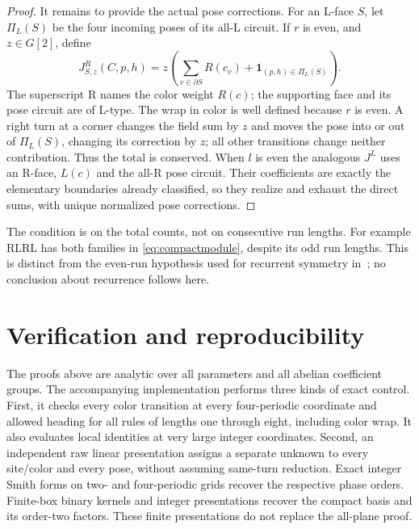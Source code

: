 \documentclass[11pt]{article}
\theoremstyle{definition}
\newcommand{\ind}{\mathbf 1}
\begin{document}
\begin{proof}
It remains to provide the actual pose corrections. For an L-face $S$, let
$\Pi_L(S)$ be the four incoming poses of its all-L circuit. If $r$ is even,
and $z\in G[2]$, define
\begin{equation}\label{eq:compactgenerator}
 J^R_{S,z}(C,p,h)
 =z\left(\sum_{v\in\partial S}R(c_v)+\ind_{(p,h)\in\Pi_L(S)}\right).
\end{equation}
The superscript R names the color weight $R(c)$; the supporting face and
its pose circuit are of L-type. The wrap in color is well defined because $r$ is even. A right turn at a
corner changes the field sum by $z$ and moves the pose into or out of
$\Pi_L(S)$, changing its correction by $z$; all other transitions change
neither contribution. Thus the total is conserved. When $l$ is even the
analogous $J^L$ uses an R-face, $L(c)$ and the all-R pose circuit. Their
coefficients are exactly the elementary boundaries already classified, so
they realize and exhaust the direct sums, with unique normalized pose corrections.
\end{proof}

The condition is on the total counts, not on consecutive run lengths. For
example RLRL has both families in \eqref{eq:compactmodule}, despite its odd run
lengths. This is distinct from the even-run hypothesis used for recurrent
symmetry in~\cite{gale}; no conclusion about recurrence follows here.

\section{Verification and reproducibility}
The proofs above are analytic over all parameters and all abelian coefficient
groups. The accompanying implementation performs three kinds of exact control.
First, it checks every color transition at every four-periodic coordinate and
allowed heading for all rules of lengths one through eight, including color
wrap. It also evaluates local identities at very large integer coordinates.
Second, an independent raw linear presentation assigns a separate unknown to
every site/color and every pose, without assuming same-turn reduction. Exact
integer Smith forms on two- and four-periodic grids recover the respective phase
orders. Finite-box binary kernels and integer presentations recover the compact
basis and its order-two factors. These finite presentations do not replace the
all-plane proof.
\end{document}
